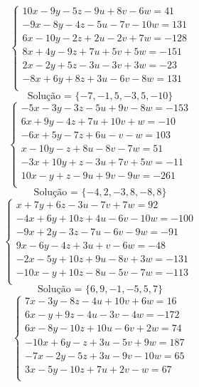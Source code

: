 \documentclass[12pt,oneside,a4paper]{article}
\begin{document}
\vspace{\baselineskip}
\begin{equation*}
\begin{cases}
10x-9y-5z-9u+8v-6w=41 \\
-9x-8y-4z-5u-7v-10w=131 \\
6x-10y-2z+2u-2v+7w=-128 \\
8x+4y-9z+7u+5v+5w=-151 \\
2x-2y+5z-3u-3v+3w=-23 \\
-8x+6y+8z+3u-6v-8w=131 \\
\end{cases}
\end{equation*}
\begin{equation*}
\text{Solução = }\{-7,-1,5,-3,5,-10\}
\end{equation*}
\vspace{\baselineskip}
\begin{equation*}
\begin{cases}
-5x-3y-3z-5u+9v-8w=-153 \\
6x+9y-4z+7u+10v+w=-10 \\
-6x+5y-7z+6u-v-w=103 \\
x-10y-z+8u-8v-7w=51 \\
-3x+10y+z-3u+7v+5w=-11 \\
10x-y+z-9u+9v-9w=-261 \\
\end{cases}
\end{equation*}
\begin{equation*}
\text{Solução = }\{-4,2,-3,8,-8,8\}
\end{equation*}
\vspace{\baselineskip}
\begin{equation*}
\begin{cases}
x+7y+6z-3u-7v+7w=92 \\
-4x+6y+10z+4u-6v-10w=-100 \\
-9x+2y-3z-7u-6v-9w=-91 \\
9x-6y-4z+3u+v-6w=-48 \\
-2x-5y+10z+9u-8v+3w=-131 \\
-10x-y+10z-8u-5v-7w=-113 \\
\end{cases}
\end{equation*}
\begin{equation*}
\text{Solução = }\{6,9,-1,-5,5,7\}
\end{equation*}
\vspace{\baselineskip}
\begin{equation*}
\begin{cases}
7x-3y-8z-4u+10v+6w=16 \\
6x-y+9z-4u-3v-4w=-172 \\
6x-8y-10z+10u-6v+2w=74 \\
-10x+6y-z+3u-5v+9w=187 \\
-7x-2y-5z+3u-9v-10w=65 \\
3x-5y-10z+7u+2v-w=67 \\
\end{cases}
\end{equation*}
\end{document}
